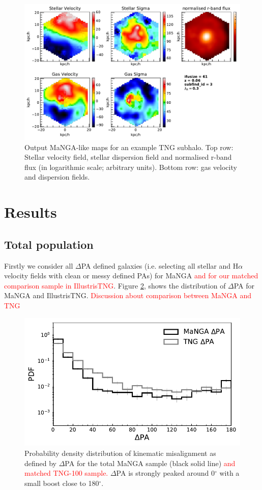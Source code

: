 \documentclass[fleqn,usenatbib]{mnras}
\newcommand{\red}[1]{{\textcolor{red}{#1}}}
\begin{document}
\begin{figure}
	\includegraphics[width=\linewidth]{example_grid.pdf}
    \caption{Output MaNGA-like maps for an example TNG subhalo. Top row: Stellar velocity field, stellar dispersion field and normalised r-band flux (in logarithmic scale; arbitrary units). Bottom row: gas velocity and dispersion fields.}
    \label{fig:example_obs}
\end{figure}

\section{Results}
\subsection{Total population} \label{sec:manga_total_pop}
Firstly we consider all $\Delta$PA defined galaxies (i.e. selecting all stellar and H$\alpha$ velocity fields with clean or messy defined PAs) for MaNGA \red{and for our matched comparison sample in IllustrisTNG}. Figure \ref{fig:total_pa_dist}, shows the distribution of $\Delta$PA for MaNGA and IllustrisTNG. \red{Discussion about comparison between MaNGA and TNG}

\begin{figure}
	\includegraphics[width=\linewidth]{total_pop/mpl8_pa_dist.pdf}
    \caption{Probability density distribution of kinematic misalignment as defined by $\Delta$PA for the total MaNGA sample (black solid line) \red{and matched TNG-100 sample.} $\Delta$PA is strongly peaked around 0$^{\circ}$ with a small boost close to 180$^{\circ}$.}
    \label{fig:total_pa_dist}
\end{figure}
\end{document}
